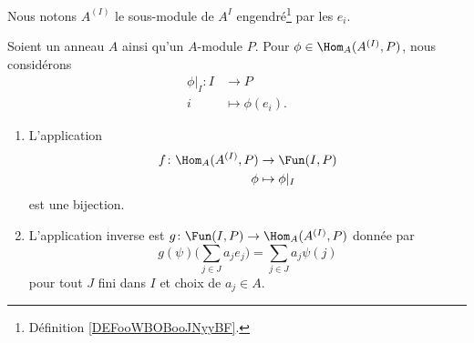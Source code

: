 \begin{normaltext}
    Nous notons \( A^{(I)}\) le sous-module de \( A^I\) engendré\footnote{Définition \ref{DEFooWBOBooJNyyBF}.} par les \( e_i\).
\end{normaltext}

\begin{theorem}      \label{THOooPDZCooJnHbOd}
    Soient un anneau \( A\) ainsi qu'un \( A\)-module \( P\). Pour \( \phi\in\Hom_A(A^{(I)}, P)\), nous considérons
    \begin{equation}
        \begin{aligned}
            \phi|_I\colon I&\to P \\
            i&\mapsto \phi(e_i). 
        \end{aligned}
    \end{equation}
    \begin{enumerate}
        \item
            
    L'application
    \begin{equation}
        \begin{aligned}
            f\colon \Hom_A(A^{(I)},P)&\to \Fun(I,P) \\
            \phi&\mapsto \phi|_I 
        \end{aligned}
    \end{equation}
    est une bijection.
\item
    L'application inverse est \( g\colon \Fun(I,P)\to \Hom_A(A^{(I)},P) \) donnée par
    \begin{equation}
        g(\psi)\big( \sum_{j\in J}a_je_j \big)=\sum_{j\in J}a_j\psi(j)
    \end{equation}
    pour tout \( J\) fini dans \( I\) et choix de \( a_j\in A\).
    \end{enumerate}
\end{theorem}

